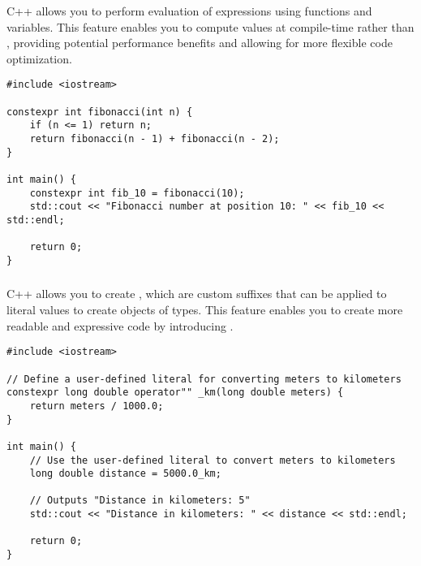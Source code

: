 C++ allows you to perform  evaluation of expressions using  functions and variables. This feature enables you to compute values at compile-time rather than , providing potential performance benefits and allowing for more flexible code optimization.
\begin{lstlisting}
#include <iostream>

constexpr int fibonacci(int n) {
    if (n <= 1) return n;
    return fibonacci(n - 1) + fibonacci(n - 2);
}

int main() {
    constexpr int fib_10 = fibonacci(10);
    std::cout << "Fibonacci number at position 10: " << fib_10 << std::endl;

    return 0;
}
\end{lstlisting}









\subsubsection{ }


C++ allows you to create  , which are custom suffixes that can be applied to literal values to create objects of  types. This feature enables you to create more readable and expressive code by introducing  .
\begin{lstlisting}
#include <iostream>

// Define a user-defined literal for converting meters to kilometers
constexpr long double operator"" _km(long double meters) {
    return meters / 1000.0;
}

int main() {
    // Use the user-defined literal to convert meters to kilometers
    long double distance = 5000.0_km;

	// Outputs "Distance in kilometers: 5"
    std::cout << "Distance in kilometers: " << distance << std::endl;

    return 0;
}
\end{lstlisting}

